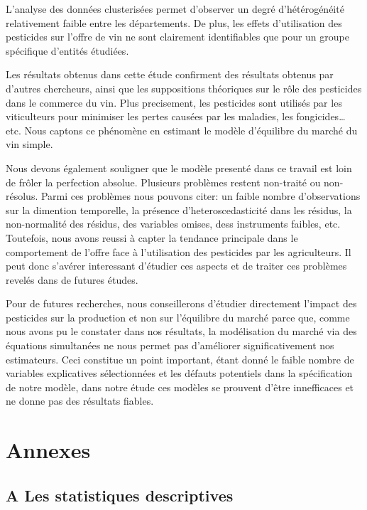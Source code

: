 \documentclass[11pt,]{article}
\begin{document}
L'analyse des données clusterisées permet d'observer un degré
d'hétérogénéité relativement faible entre les départements. De plus, les
effets d'utilisation des pesticides sur l'offre de vin ne sont
clairement identifiables que pour un groupe spécifique d'entités
étudiées.

Les résultats obtenus dans cette étude confirment des résultats obtenus
par d'autres chercheurs, ainsi que les suppositions théoriques sur le
rôle des pesticides dans le commerce du vin. Plus precisement, les
pesticides sont utilisés par les viticulteurs pour minimiser les pertes
causées par les maladies, les fongicides\ldots{} etc. Nous captons ce
phénomène en estimant le modèle d'équilibre du marché du vin simple.

Nous devons également souligner que le modèle presenté dans ce travail
est loin de frôler la perfection absolue. Plusieurs problèmes restent
non-traité ou non-résolus. Parmi ces problèmes nous pouvons citer: un
faible nombre d'observations sur la dimention temporelle, la présence
d'heteroscedasticité dans les résidus, la non-normalité des résidus, des
variables omises, dess instruments faibles, etc. Toutefois, nous avons
reussi à capter la tendance principale dans le comportement de l'offre
face à l'utilisation des pesticides par les agriculteurs. Il peut donc
s'avérer interessant d'étudier ces aspects et de traiter ces problèmes
revelés dans de futures études.

Pour de futures recherches, nous conseillerons d'étudier directement
l'impact des pesticides sur la production et non sur l'équilibre du
marché parce que, comme nous avons pu le constater dans nos résultats,
la modélisation du marché via des équations simultanées ne nous permet
pas d'améliorer significativement nos estimateurs. Ceci constitue un
point important, étant donné le faible nombre de variables explicatives
sélectionnées et les défauts potentiels dans la spécification de notre
modèle, dans notre étude ces modèles se prouvent d'être innefficaces et
ne donne pas des résultats fiables.

\newpage

\hypertarget{annexes}{%
\section{Annexes}\label{annexes}}

\hypertarget{a-les-statistiques-descriptives}{%
\subsection{A Les statistiques
descriptives}\label{a-les-statistiques-descriptives}}
\end{document}
